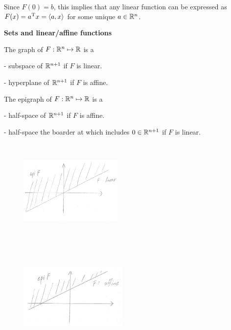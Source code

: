 Since $F(0)=b$, this implies that any linear function can be expressed as $F(x)=a^{{\rm T}} x=\langle a,x\rangle$ for some unique $a\in\mathbb{R}^{n}$.

\vspace{0.5cm}
\textbf{Sets and linear/affine functions}

The graph of $F:\mathbb{R}^{n}\mapsto\mathbb{R}$ is a 

\quad- subspace of $\mathbb{R}^{n+1}$ if $F$ is linear.

\quad- hyperplane of $\mathbb{R}^{n+1}$ if $F$ is affine.

\vspace{0.2cm}
The epigraph of $F:\mathbb{R}^{n}\mapsto\mathbb{R}$ is a 

\quad- half-space of $\mathbb{R}^{n+1}$ if $F$ is affine.

\quad- half-space the boarder at which includes $0\in\mathbb{R}^{n+1}$ if $F$ is linear.


\begin{figure}
	\centering
	\includegraphics[width=2in,height=2in]{figures/ch02/p50-1.jpg}
\end{figure}

\begin{figure}
	\centering
	\includegraphics[width=2.1in,height=2.1in]{figures/ch02/p50-2.jpg}
\end{figure}


